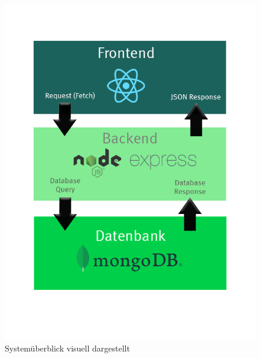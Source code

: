 \documentclass[conference,a4paper,flushend]{cs-techrep}
\begin{document}
\begin{figure}[h]
    \centering
    \includegraphics[width=1\linewidth]{systemueberblick.png}
    \caption{Systemüberblick visuell dargestellt}
    \label{fig:enter-label}
\end{figure}
\end{document}
